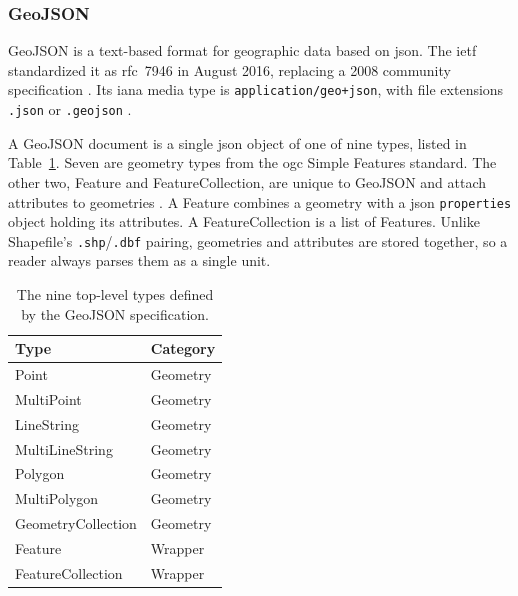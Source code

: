 \subsubsection{GeoJSON}
\label{background:spatial-data-formats-and-storage-models:file-formats:geojson}
GeoJSON is a text-based format for geographic data based on \acrfull{json}. The \acrfull{ietf} standardized it as \acrfull{rfc}~7946 in August 2016, replacing a 2008 community specification \parencite{butler2016_rfc7946_geojson_format}. Its \acrfull{iana} media type is \texttt{application/geo+json}, with file extensions \texttt{.json} or \texttt{.geojson} \parencite{butler2016_rfc7946_geojson_format}.

A GeoJSON document is a single \acrshort{json} object of one of nine types, listed in Table~\ref{tab:geojson-types}. Seven are geometry types from the \acrshort{ogc} Simple Features standard. The other two, Feature and FeatureCollection, are unique to GeoJSON and attach attributes to geometries \parencite{butler2016_rfc7946_geojson_format}. A Feature combines a geometry with a \acrshort{json} \texttt{properties} object holding its attributes. A FeatureCollection is a list of Features. Unlike Shapefile's \texttt{.shp}/\texttt{.dbf} pairing, geometries and attributes are stored together, so a reader always parses them as a single unit.

\begin{table}[H]
    \centering
    \begin{tabular}{ll}
        \toprule
        \textbf{Type} & \textbf{Category} \\
        \midrule
        Point               & Geometry \\
        MultiPoint          & Geometry \\
        LineString          & Geometry \\
        MultiLineString     & Geometry \\
        Polygon             & Geometry \\
        MultiPolygon        & Geometry \\
        GeometryCollection  & Geometry \\
        Feature             & Wrapper  \\
        FeatureCollection   & Wrapper  \\
        \bottomrule
    \end{tabular}
    \caption[GeoJSON top-level types.]{The nine top-level types defined by the GeoJSON specification.}
    \label{tab:geojson-types}
\end{table}

